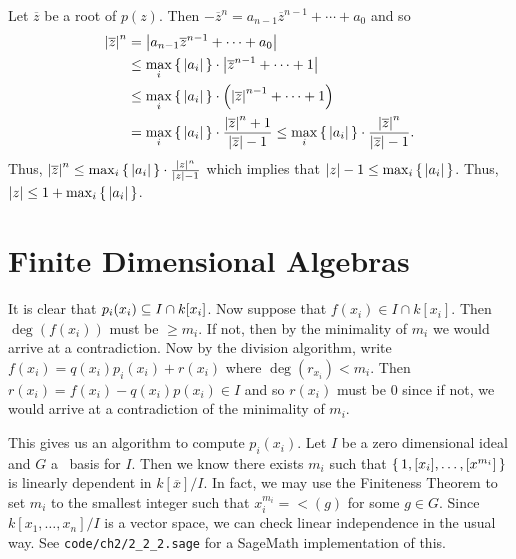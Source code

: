 \documentclass[letterpaper, 11pt, oneside]{book}
\begin{document}
\begin{sol}\label{ex:UAG_2.1.10}
  Let $\overline{z}$ be a root of $p(z)$.
  Then $-\overline{z}^{n} = a_{n - 1}\overline{z}^{n - 1} + \cdots + a_{0}$ and so
  \begin{align*}
    \abs{\overline{z}}^{n} &= \abs{a_{n - 1}\overline{z}^{n - 1} + \cdots + a_{0}} \\
                           &\leq \max_{i}\set{\abs{a_{i}}} \cdot \abs{\overline{z}^{n - 1} + \cdots + 1} \\
                           &\leq \max_{i}\set{\abs{a_{i}}} \cdot \pqty{\abs{\overline{z}}^{n - 1} + \cdots + 1} \\
                           &= \max_{i}\set{\abs{a_{i}}} \cdot \frac{\abs{\overline{z}}^{n} + 1}{\abs{\overline{z}} - 1} \leq \max_{i}\set{\abs{a_{i}}} \cdot \frac{\abs{\overline{z}}^{n}}{\abs{\overline{z}} - 1}.
  \end{align*}
  Thus, $\abs{\overline{z}}^{n} \leq \max_{i}\set{\abs{a_{i}}} \cdot \frac{\abs{z}^{n}}{\abs{z} - 1}$ which implies that $\abs{z} - 1 \leq \max_{i}\set{\abs{a_{i}}}$.
  Thus, $\abs{z} \leq 1 + \max_{i}\set{\abs{a_{i}}}$.
\end{sol}

\clearpage

\section{Finite Dimensional Algebras}

\begin{sol}\label{ex:UAG_2.2.1}
\end{sol}

\begin{sol}\label{ex:UAG_2.2.2}
  It is clear that $\ideal{p_{i}(x_{i})} \subseteq I \cap k[x_{i}]$.
  Now suppose that $f(x_{i}) \in I \cap k[x_{i}]$.
  Then $\deg(f(x_{i}))$ must be $\geq m_{i}$.
  If not, then by the minimality of $m_{i}$ we would arrive at a contradiction.
  Now by the division algorithm, write $f(x_{i}) = q(x_{i})p_{i}(x_{i}) + r(x_{i})$ where $\deg(r_{x_{i}}) < m_{i}$.
  Then $r(x_{i}) = f(x_{i}) - q(x_{i})p(x_{i}) \in I$ and so $r(x_{i})$ must be $0$ since if not, we would arrive at a contradiction of the minimality of $m_{i}$.

  This gives us an algorithm to compute $p_{i}(x_{i})$.
  Let $I$ be a zero dimensional ideal and $G$ a \Grobner\ basis for $I$.
  Then we know there exists $m_{i}$ such that $\set{1, [x_{i}], \ldots, [x^{m_{i}}]}$ is linearly dependent in $k[\overline{x}] / I$.
  In fact, we may use the Finiteness Theorem to set $m_{i}$ to the smallest integer such that $x_{i}^{m_{i}} = \lt(g)$ for some $g \in G$.
  Since $k[x_{1}, \ldots, x_{n}] / I$ is a vector space, we can check linear independence in the usual way.
  See \texttt{code/ch2/2\_2\_2.sage} for a SageMath implementation of this.
\end{sol}
\end{document}

